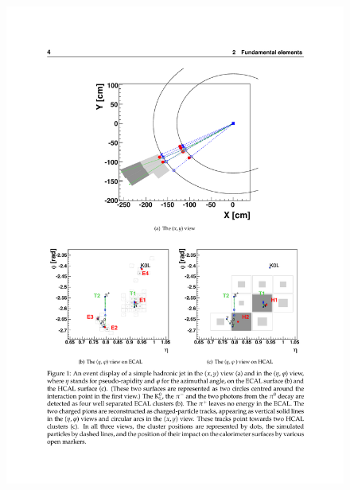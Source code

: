 \begin{figure}[hbtp]
\begin{center}
    \includegraphics[width=1.0\cmsFigWidth]{figures/cms-pflow-b}

\end{center}
\end{figure}
